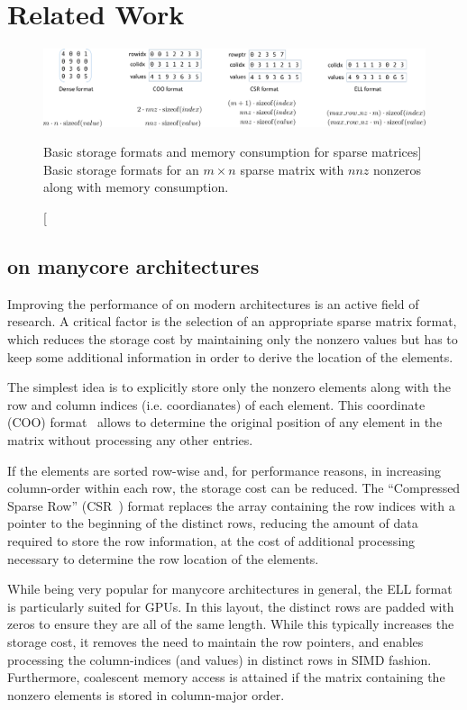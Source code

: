 \section{Related Work}
\label{2017-batched-spmv:sec:related}


\begin{figure}[t]
\centering
\includegraphics[width=\columnwidth]{plots/formats}
\caption
[Basic storage formats and memory consumption for sparse matrices]
{Basic storage formats for an $m\times n$ sparse matrix with $nnz$
    nonzeros along with memory consumption.}
\label{2017-batched-spmv:fig:formatoverview}
\end{figure}

\subsection{\spmv on manycore architectures}

Improving the performance of \spmv on modern architectures is an active field of research. 
A critical factor is the selection of an appropriate
sparse matrix format, which reduces the storage cost by maintaining only the nonzero values
but has to keep some additional information in order to derive the location of the elements.

The simplest idea is to explicitly store only the nonzero elements
along with the row and column indices (i.e. coordianates) of each element.
This coordinate (COO)
format~\cite{barrettemplates} allows to determine the original position of any element
in the matrix without processing any other entries.

If the elements are sorted row-wise and, for performance reasons,
in increasing column-order within each row,
the storage cost can be reduced.
The ``Compressed Sparse Row'' (CSR~\cite{barrettemplates})
format
replaces the array containing the row indices with a pointer to the beginning 
of the distinct rows, reducing the amount of data required to store the row
information, at the cost of
additional processing necessary to determine the row location of the elements.

While being very
popular for manycore architectures in general, the ELL format~\cite{ellpack}
is particularly suited for GPUs.
In this layout, the distinct rows are padded with zeros to ensure
they are all of the same length.
While this typically increases the storage cost, 
it removes the need to maintain the row pointers,
and enables processing the column-indices (and values) in distinct
rows in SIMD fashion. Furthermore,
coalescent memory access is attained if the matrix containing
the nonzero elements
is stored in column-major order.

